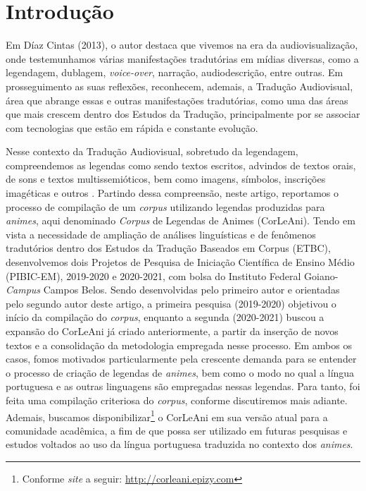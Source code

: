 \documentclass[portuguese]{textolivre}
\begin{document}
\section{Introdução}\label{sec-intro}
Em Díaz Cintas (2013), o autor destaca que vivemos na era da audiovisualização, onde testemunhamos várias manifestações tradutórias em mídias diversas, como a legendagem, dublagem, \textit{voice-over}, narração, audiodescrição, entre outras. Em prosseguimento as suas reflexões, \textcite{diaz_cintas_taking_2015} reconhecem, ademais, a Tradução Audiovisual, área que abrange essas e outras manifestações tradutórias, como uma das áreas que mais crescem dentro dos Estudos da Tradução, principalmente por se associar com tecnologias que estão em rápida e constante evolução.

Nesse contexto da Tradução Audiovisual, sobretudo da legendagem, compreendemos as legendas como sendo textos escritos, advindos de textos orais, de sons e textos multissemióticos, bem como imagens, símbolos, inscrições imagéticas e outros \cite{diaz-cintas_audiovisual_2007}. Partindo dessa compreensão, neste artigo, reportamos o processo de compilação de um \textit{corpus} utilizando legendas produzidas para \textit{animes}, aqui denominado \textit{Corpus} de Legendas de Animes (CorLeAni). Tendo em vista a necessidade de ampliação de análises linguísticas e de fenômenos tradutórios dentro dos Estudos da Tradução Baseados em Corpus (ETBC), desenvolvemos dois Projetos de Pesquisa de Iniciação Científica de Ensino Médio (PIBIC-EM), 2019-2020 e 2020-2021, com bolsa do Instituto Federal Goiano-\textit{Campus} Campos Belos. Sendo desenvolvidas pelo primeiro autor e orientadas pelo segundo autor deste artigo, a primeira pesquisa (2019-2020) objetivou o início da compilação do \textit{corpus}, enquanto a segunda (2020-2021) buscou a expansão do CorLeAni já criado anteriormente, a partir da inserção de novos textos e a consolidação da metodologia empregada nesse processo. Em ambos os casos, fomos motivados particularmente pela crescente demanda para se entender o processo de criação de legendas de \textit{animes}, bem como o modo no qual a língua portuguesa e as outras linguagens são empregadas nessas legendas. Para tanto, foi feita uma compilação criteriosa do \textit{corpus}, conforme discutiremos mais adiante. Ademais, buscamos disponibilizar\footnote{Conforme \textit{site} a seguir: \url{http://corleani.epizy.com}} o CorLeAni em sua versão atual para a comunidade acadêmica, a fim de que possa ser utilizado em futuras pesquisas e estudos voltados ao uso da língua portuguesa traduzida no contexto dos \textit{animes}.
\end{document}
